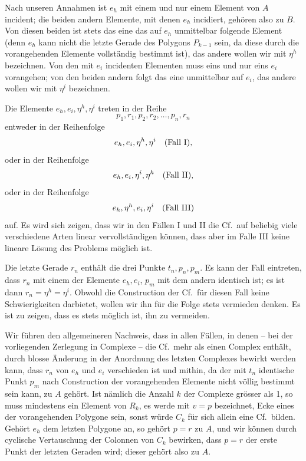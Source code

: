 \documentclass[11pt]{article}
\newcommand{\Cf}{\textup{Cf.}}
\begin{document}
Nach unseren Annahmen ist $e_h$ mit einem und nur einem Element von $A$ incident; die beiden andern Elemente, mit denen $e_h$ incidiert, gehören also zu $B$. Von diesen beiden ist stets das eine das auf $e_h$ unmittelbar folgende Element (denn $e_h$ kann nicht die letzte Gerade des Polygons $P_{k-1}$ sein, da diese durch die vorangehenden Elemente vollständig bestimmt ist), das andere wollen wir mit $\eta^h$ bezeichnen. Von den mit $e_i$ incidenten Elementen muss eins und nur eins $e_i$ vorangehen; von den beiden andern folgt das eine unmittelbar auf $e_i$, das andere wollen wir mit $\eta^i$ bezeichnen.

Die Elemente $e_h,e_i,\eta^h,\eta^i$ treten in der Reihe
\[
p_1,r_1,p_2,r_2,\ldots,p_n,r_n
\]
entweder in der Reihenfolge
\[
e_h,\\ e_i,\\ \eta^h,\\ \eta^i \quad(\text{Fall I}),
\]
oder in der Reihenfolge
\[
e_h,\\ e_i,\\ \eta^i,\\ \eta^h \quad(\text{Fall II}),
\]
oder in der Reihenfolge
\[
e_h,\\ \eta^h,\\ e_i,\\ \eta^i \quad(\text{Fall III})
\]
auf. Es wird sich zeigen, dass wir in den Fällen I und II die \Cf\ auf beliebig viele verschiedene Arten linear vervollständigen können, dass aber im Falle III keine lineare Lösung des Problems möglich ist.

Die letzte Gerade $r_n$ enthält die drei Punkte $t_n,p_n,p_m$. Es kann der Fall eintreten, dass $r_n$ mit einem der Elemente $e_h,e_i$, $p_m$ mit dem andern identisch ist; es ist dann $r_n=\eta^h=\eta^i$. Obwohl die Construction der \Cf\ für diesen Fall keine Schwierigkeiten darbietet, wollen wir ihn für die Folge stets vermieden denken. Es ist zu zeigen, dass es stets möglich ist, ihn zu vermeiden.

Wir führen den allgemeineren Nachweis, dass in allen Fällen, in denen -- bei der vorliegenden Zerlegung in Complexe -- die \Cf\ mehr als einen Complex enthält, durch blosse Änderung in der Anordnung des letzten Complexes bewirkt werden kann, dass $r_n$ von $e_h$ und $e_i$ verschieden ist und mithin, da der mit $t_n$ identische Punkt $p_m$ nach Construction der vorangehenden Elemente nicht völlig bestimmt sein kann, zu $A$ gehört. Ist nämlich die Anzahl $k$ der Complexe grösser als 1, so muss mindestens ein Element von $R_k$, es werde mit $v=p$ bezeichnet, Ecke eines der vorangehenden Polygone sein, sonst würde $C_k$ für sich allein eine \Cf\ bilden. Gehört $e_h$ dem letzten Polygone an, so gehört $p=r$ zu $A$, und wir können durch cyclische Vertauschung der Colonnen von $C_k$ bewirken, dass $p=r$ der erste Punkt der letzten Geraden wird; dieser gehört also zu $A$.
\end{document}
